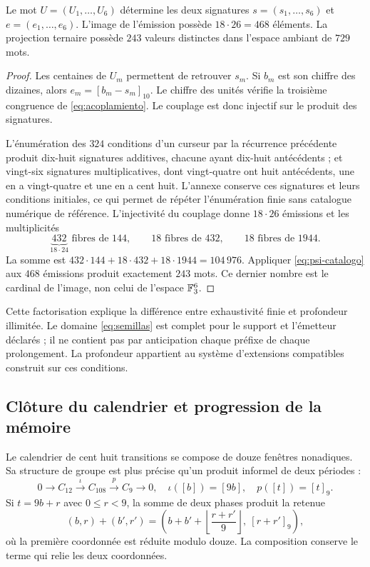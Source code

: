 \begin{proposition}
Le mot \(U=(U_1,\ldots,U_6)\) détermine les deux signatures \(s=(s_1,\ldots,s_6)\) et \(e=(e_1,\ldots,e_6)\). L’image de l’émission possède \(18\cdot26=468\) éléments. La projection ternaire possède \(243\) valeurs distinctes dans l’espace ambiant de \(729\) mots.
\end{proposition}
\begin{proof}
Les centaines de \(U_m\) permettent de retrouver \(s_m\). Si \(b_m\) est son chiffre des dizaines, alors \(e_m=[b_m-s_m]_{10}\). Le chiffre des unités vérifie la troisième congruence de \eqref{eq:acoplamiento}. Le couplage est donc injectif sur le produit des signatures.

L’énumération des \(324\) conditions d’un curseur par la récurrence précédente produit dix-huit signatures additives, chacune ayant dix-huit antécédents ; et vingt-six signatures multiplicatives, dont vingt-quatre ont huit antécédents, une en a vingt-quatre et une en a cent huit. L’annexe conserve ces signatures et leurs conditions initiales, ce qui permet de répéter l’énumération finie sans catalogue numérique de référence. L’injectivité du couplage donne \(18\cdot26\) émissions et les multiplicités
\[
 \underbrace{432}_{18\cdot24}\text{ fibres de }144,
 \qquad18\text{ fibres de }432,
 \qquad18\text{ fibres de }1944.
\]
La somme est \(432\cdot144+18\cdot432+18\cdot1944=104\,976\). Appliquer \eqref{eq:psi-catalogo} aux \(468\) émissions produit exactement \(243\) mots. Ce dernier nombre est le cardinal de l’image, non celui de l’espace \(\mathbb F_3^6\).
\end{proof}

Cette factorisation explique la différence entre exhaustivité finie et profondeur illimitée. Le domaine \eqref{eq:semillas} est complet pour le support et l’émetteur déclarés ; il ne contient pas par anticipation chaque préfixe de chaque prolongement. La profondeur appartient au système d’extensions compatibles construit sur ces conditions.

\subsection{Clôture du calendrier et progression de la mémoire}

Le calendrier de cent huit transitions se compose de douze fenêtres nonadiques. Sa structure de groupe est plus précise qu’un produit informel de deux périodes :
\begin{equation}
 0\longrightarrow C_{12}\xrightarrow{\iota}C_{108}
 \xrightarrow{p}C_9\longrightarrow0,
 \quad\iota([b])=[9b],\quad p([t])=[t]_9.
 \label{eq:extension108}
\end{equation}
Si \(t=9b+r\) avec \(0\le r<9\), la somme de deux phases produit la retenue
\[
 (b,r)+(b',r')=
 \left(b+b'+\left\lfloor\frac{r+r'}9\right\rfloor,\ [r+r']_9\right),
\]
où la première coordonnée est réduite modulo douze. La composition conserve le terme qui relie les deux coordonnées.

